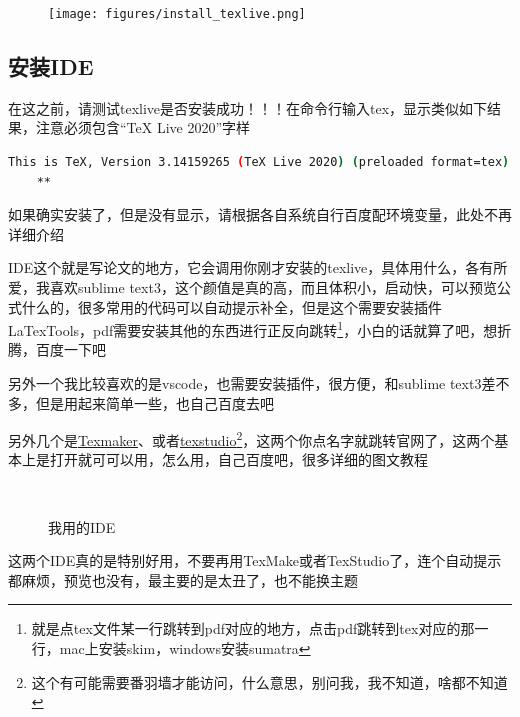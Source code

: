 \documentclass[AutoFakeBold]{LZUThesis2007}
\begin{document}
\begin{figure}[H]
    \centering
    \texttt{[image: figures/install\_texlive.png]}

\end{figure}





\subsection{安装IDE} %
\label{sub:安装ide}

在这之前，请测试texlive是否安装成功！！！在命令行输入tex，显示类似如下结果，注意必须包含“TeX Live 2020”字样

\begin{lstlisting}[language=bash]
    This is TeX, Version 3.14159265 (TeX Live 2020) (preloaded format=tex)
    **
\end{lstlisting}


如果确实安装了，但是没有显示，请根据各自系统自行百度配环境变量，此处不再详细介绍


IDE这个就是写论文的地方，它会调用你刚才安装的texlive，具体用什么，各有所爱，我喜欢sublime text3，这个颜值是真的高，而且体积小，启动快，可以预览公式什么的，很多常用的代码可以自动提示补全，但是这个需要安装插件LaTexTools，pdf需要安装其他的东西进行正反向跳转\footnote{就是点tex文件某一行跳转到pdf对应的地方，点击pdf跳转到tex对应的那一行，mac上安装skim，windows安装sumatra}，小白的话就算了吧，想折腾，百度一下吧


另外一个我比较喜欢的是vscode，也需要安装插件，很方便，和sublime text3差不多，但是用起来简单一些，也自己百度去吧

另外几个是\href{https://www.xm1math.net/texmaker}{Texmaker}、或者\href{http://texstudio.sourceforge.net/}{texstudio}\footnote{这个有可能需要番羽墙才能访问，什么意思，别问我，我不知道，啥都不知道}，这两个你点名字就跳转官网了，这两个基本上是打开就可可以用，怎么用，自己百度吧，很多详细的图文教程


\begin{figure}[H]
	\centering
	\qquad
	\\
    \caption{我用的IDE}
    \label{fig_ide}
\end{figure}

这两个IDE真的是特别好用，不要再用TexMake或者TexStudio了，连个自动提示都麻烦，预览也没有，最主要的是太丑了，也不能换主题
\end{document}

